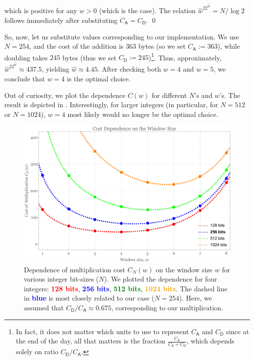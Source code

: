 \documentclass{iacrtrans}
\begin{document}
which is positive for any $w>0$ (which is the case). The relation $\hat{w}^22^{\hat{w}}=N/\log 2$ follows immediately after substituting $C_{\mathsf{A}} = C_{\mathsf{D}}$. \qed

So, now, let us substitute values corresponding to our implementation. We use $N=254$, and the cost of the addition is $363$ bytes (so we set $C_{\mathsf{A}}:=363$), while doubling takes $245$ bytes (thus we set $C_{\mathsf{D}}:= 245$)\footnote{In fact, it does not matter which units to use to represent $C_{\mathsf{A}}$ and $C_{\mathsf{D}}$ since at the end of the day, all that matters is the fraction $\frac{C_{\mathsf{A}}}{C_{\mathsf{A}}+C_{\mathsf{D}}}$, which depends solely on ratio $C_{\mathsf{D}}/C_{\mathsf{A}}$.}. Thus, approximately, $\hat{w}^22^{\hat{w}} \approx 437.5$, yielding $\hat{w} \approx 4.45$. After checking both $w=4$ and $w=5$, we conclude that $w=4$ is the optimal choice.

Out of curiosity, we plot the dependence $C(w)$ for different $N$'s and $w$'s. The result is depicted in . Interestingly, for larger integers (in particular, for $N=512$ or $N=1024$), $w=4$ most likely would no longer be the optimal choice.

\begin{figure}
    \centering
    \includegraphics[width=0.75\linewidth]{window_dependence.pdf}
    \caption{Dependence of multiplication cost $C_N(w)$ on the window size $w$ for various integer bit-sizes ($N$). We plotted the dependence for four integers: \textbf{\textcolor{red}{128 bits}}, \textbf{\textcolor{blue}{256 bits}}, \textbf{\textcolor{green}{512 bits}}, \textbf{\textcolor{orange}{1024 bits}}. The dashed line in \textbf{\textcolor{blue}{blue}} is most closely related to our case ($N=254$). Here, we assumed that $C_{\mathsf{D}}/C_{\mathsf{A}} \approx 0.675$, corresponding to our multiplication.}
    \label{fig:w_dependence}
\end{figure}
\end{document}
